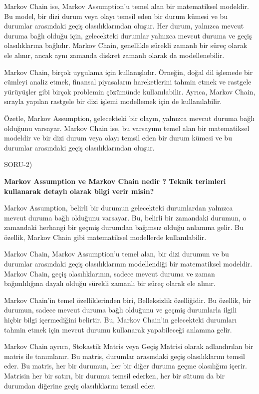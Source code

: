 \documentclass[11pt]{article}
\begin{document}
Markov Chain ise, Markov Assumption'u temel alan bir matematiksel modeldir. Bu model, bir dizi durum veya olayı temsil eden bir durum kümesi ve bu durumlar arasındaki geçiş olasılıklarından oluşur. Her durum, yalnızca mevcut duruma bağlı olduğu için, gelecekteki durumlar yalnızca mevcut duruma ve geçiş olasılıklarına bağlıdır. Markov Chain, genellikle sürekli zamanlı bir süreç olarak ele alınır, ancak aynı zamanda diskret zamanlı olarak da modellenebilir.

Markov Chain, birçok uygulama için kullanışlıdır. Örneğin, doğal dil işlemede bir cümleyi analiz etmek, finansal piyasaların hareketlerini tahmin etmek ve rastgele yürüyüşler gibi birçok problemin çözümünde kullanılabilir. Ayrıca, Markov Chain, sırayla yapılan rastgele bir dizi işlemi modellemek için de kullanılabilir.

Özetle, Markov Assumption, gelecekteki bir olayın, yalnızca mevcut duruma bağlı olduğunu varsayar. Markov Chain ise, bu varsayımı temel alan bir matematiksel modeldir ve bir dizi durum veya olayı temsil eden bir durum kümesi ve bu durumlar arasındaki geçiş olasılıklarından oluşur.

SORU-2)

\textbf{Markov Assumption ve Markov Chain nedir ? Teknik terimleri kullanarak detaylı olarak bilgi verir misin?}

Markov Assumption, belirli bir durumun gelecekteki durumlardan yalnızca mevcut duruma bağlı olduğunu varsayar. Bu, belirli bir zamandaki durumun, o zamandaki herhangi bir geçmiş durumdan bağımsız olduğu anlamına gelir. Bu özellik, Markov Chain gibi matematiksel modellerde kullanılabilir.

Markov Chain, Markov Assumption'u temel alan, bir dizi durumun ve bu durumlar arasındaki geçiş olasılıklarının modellendiği bir matematiksel modeldir. Markov Chain, geçiş olasılıklarının, sadece mevcut duruma ve zaman bağımlılığına dayalı olduğu sürekli zamanlı bir süreç olarak ele alınır.

Markov Chain'in temel özelliklerinden biri, Belleksizlik özelliğidir. Bu özellik, bir durumun, sadece mevcut duruma bağlı olduğunu ve geçmiş durumlarla ilgili hiçbir bilgi içermediğini belirtir. Bu, Markov Chain'in gelecekteki durumları tahmin etmek için mevcut durumu kullanarak yapabileceği anlamına gelir.

Markov Chain ayrıca, Stokastik Matris veya Geçiş Matrisi olarak adlandırılan bir matris ile tanımlanır. Bu matris, durumlar arasındaki geçiş olasılıklarını temsil eder. Bu matris, her bir durumun, her bir diğer duruma geçme olasılığını içerir. Matrisin her bir satırı, bir durumu temsil ederken, her bir sütunu da bir durumdan diğerine geçiş olasılıklarını temsil eder.
\end{document}
